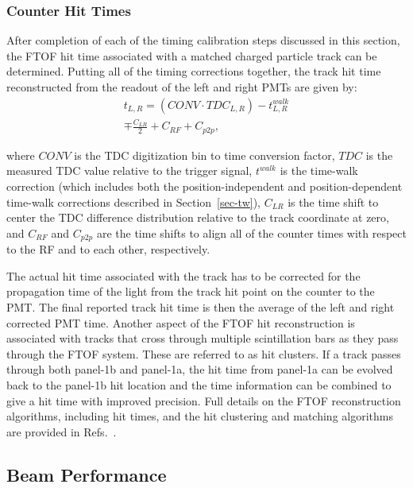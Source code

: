 \documentclass[3p,times,twocolumn]{elsarticle}
\begin{document}
\subsubsection{Counter Hit Times}
\label{cluster}

After completion of each of the timing calibration steps discussed in this section, the FTOF hit time associated
with a matched charged particle track can be determined. Putting all of the timing corrections together, the
track hit time reconstructed from the readout of the left and right PMTs are given by:
\begin{multline}
t_{L,R} = (CONV \cdot TDC_{L,R}) - t_{L,R}^{walk} \\ \mp \frac{C_{LR}}{2} + C_{RF} + C_{p2p},
\end{multline}

\noindent
where $CONV$ is the TDC digitization bin to time conversion factor, $TDC$ is the measured TDC value
relative to the trigger signal, $t^{walk}$ is the time-walk correction (which includes both the
position-independent and position-dependent time-walk corrections described in Section~\ref{sec-tw}),
$C_{LR}$ is the time shift to center the TDC difference distribution relative to the track coordinate at zero,
and $C_{RF}$ and $C_{p2p}$ are the time shifts to align all of the counter times with respect to the RF and to
each other, respectively.

The actual hit time associated with the track has to be corrected for the propagation time of the light from
the track hit point on the counter to the PMT. The final reported track hit time is then the average of
the left and right corrected PMT time. Another aspect of the FTOF hit reconstruction is associated
with tracks that cross through multiple scintillation bars as they pass through the FTOF system. These are
referred to as hit clusters. If a track passes through both panel-1b and panel-1a, the hit time from panel-1a
can be evolved back to the panel-1b hit location and the time information can be combined to give a hit time
with improved precision. Full details on the FTOF reconstruction algorithms, including hit times, and the hit
clustering and matching algorithms are provided in Refs.~\cite{recon-nim,ftof-recon}.

\subsection{Beam Performance}  
\label{sec:beam}
\end{document}
